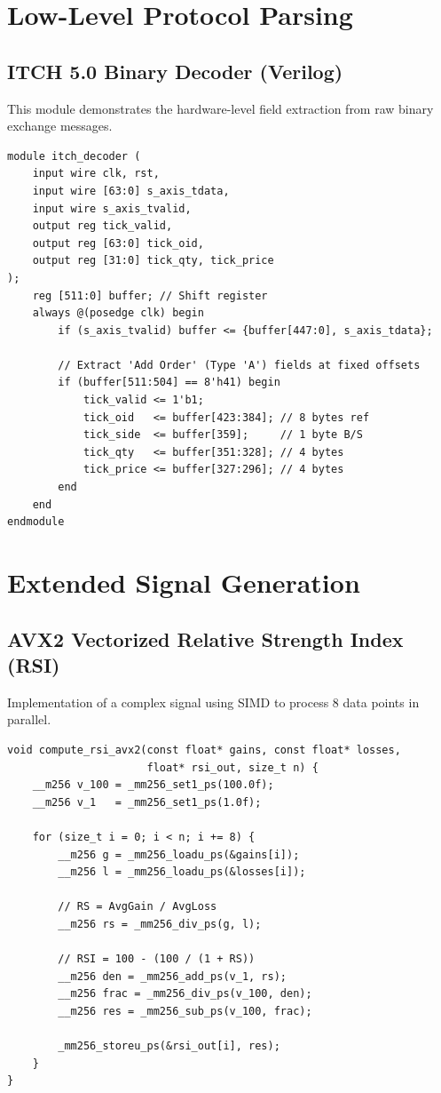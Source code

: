 \section{Low-Level Protocol Parsing}
\subsection{ITCH 5.0 Binary Decoder (Verilog)}
This module demonstrates the hardware-level field extraction from raw binary exchange messages.

\begin{lstlisting}[style=verilogstyle, caption={Hardware ITCH field extraction}, label={lst:itch_hw}]
module itch_decoder (
    input wire clk, rst,
    input wire [63:0] s_axis_tdata,
    input wire s_axis_tvalid,
    output reg tick_valid,
    output reg [63:0] tick_oid,
    output reg [31:0] tick_qty, tick_price
);
    reg [511:0] buffer; // Shift register
    always @(posedge clk) begin
        if (s_axis_tvalid) buffer <= {buffer[447:0], s_axis_tdata};
        
        // Extract 'Add Order' (Type 'A') fields at fixed offsets
        if (buffer[511:504] == 8'h41) begin
            tick_valid <= 1'b1;
            tick_oid   <= buffer[423:384]; // 8 bytes ref
            tick_side  <= buffer[359];     // 1 byte B/S
            tick_qty   <= buffer[351:328]; // 4 bytes
            tick_price <= buffer[327:296]; // 4 bytes
        end
    end
endmodule
\end{lstlisting}

\section{Extended Signal Generation}
\subsection{AVX2 Vectorized Relative Strength Index (RSI)}
Implementation of a complex signal using SIMD to process 8 data points in parallel.

\begin{lstlisting}[style=cppstyle, caption={Vectorized RSI computation}, label={lst:simd_rsi}]
void compute_rsi_avx2(const float* gains, const float* losses, 
                      float* rsi_out, size_t n) {
    __m256 v_100 = _mm256_set1_ps(100.0f);
    __m256 v_1   = _mm256_set1_ps(1.0f);
    
    for (size_t i = 0; i < n; i += 8) {
        __m256 g = _mm256_loadu_ps(&gains[i]);
        __m256 l = _mm256_loadu_ps(&losses[i]);
        
        // RS = AvgGain / AvgLoss
        __m256 rs = _mm256_div_ps(g, l);
        
        // RSI = 100 - (100 / (1 + RS))
        __m256 den = _mm256_add_ps(v_1, rs);
        __m256 frac = _mm256_div_ps(v_100, den);
        __m256 res = _mm256_sub_ps(v_100, frac);
        
        _mm256_storeu_ps(&rsi_out[i], res);
    }
}
\end{lstlisting}

